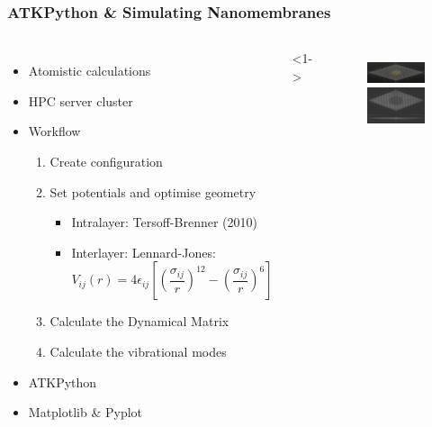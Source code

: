 \documentclass[hyperref={colorlinks=true,urlcolor=blue,linkcolor=.},aspectratio=1610,mathserif]{beamer}
\begin{document}
\begin{frame}
 \frametitle{ATKPython \& Simulating Nanomembranes}
 \begin{columns}[T]
  \begin{itemize}
   \item<1-> Atomistic calculations
   \item<2-> HPC server cluster
   \item<3-> Workflow
         \begin{enumerate}
          \item<3-> Create configuration
          \item<4-> Set potentials and optimise geometry
                \begin{itemize}
                 \item Intralayer: Tersoff-Brenner (2010)
                 \item Interlayer: Lennard-Jones:\begin{equation}
                        V_{ij}(r) = 4 \epsilon_{ij} \left[ \left( \frac{\sigma_{ij}}{r} \right) ^{12} - \left( \frac{\sigma_{ij}}{r} \right) ^6 \right] \nonumber
                       \end{equation}
                \end{itemize}
          \item<5-> Calculate the Dynamical Matrix
          \item<6-> Calculate the vibrational modes
         \end{enumerate}
    \item<7-> ATKPython
    \item<8-> Matplotlib \& Pyplot
  \end{itemize}
  <1->
  \begin{figure}
   \centering
   \includegraphics[width=\columnwidth]{Figures/NanoLayer5nm.png}
   \vspace{1em}
   \centering
   \includegraphics[width=\columnwidth]{Figures/DoubleMembrane.png}

\end{figure}
\end{columns}
\end{frame}
\end{document}
